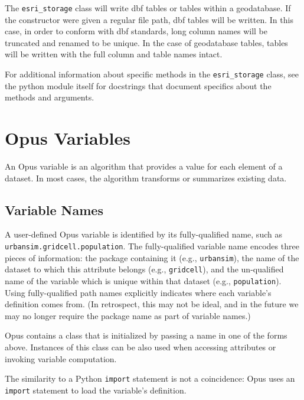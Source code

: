 {The \verb|esri_storage| class will write dbf tables or tables within a geodatabase.  If the 
constructor were given a regular file path, dbf tables will be written.  In this case, in order 
to conform with dbf standards, long column names will be truncated and renamed to be unique.  In the 
case of geodatabase tables, tables will be written with the full column and table names intact.

For additional information about specific methods in the \verb|esri_storage| class, see the python 
module itself for docstrings that document specifics about the methods and arguments.

\section{Opus Variables} 
\label{sec:opus-variable}
\variablesindex

An Opus variable \variablesindex is an algorithm that provides a value for
each element of a dataset. \datasetindex In most cases, the algorithm
transforms or summarizes existing data.

\subsection{Variable Names}
\label{sec:variable-names}
\variablesindex

A user-defined Opus variable \variablesindex is identified by its
fully-qualified name, such as \verb|urbansim.gridcell.population|.  The
fully-qualified variable \variablesindex name encodes three pieces of
information: the package containing it (e.g., \verb|urbansim|), the name of
the dataset \datasetindex to which this attribute \attributesindex belongs
(e.g., \verb|gridcell|), and the un-qualified name of the variable
\variablesindex which is unique within that dataset \datasetindex (e.g.,
\verb|population|).  Using fully-qualified path names explicitly indicates where
each variable's definition comes from.  (In retrospect, this may not be
ideal, and in the future we may no longer require the package name as part
of variable names.)

Opus contains a class  \variablesindex that is initialized by passing a
name in one of the forms above. Instances of this class can be also used when
accessing attributes \attributesindex or invoking variable \variablesindex computation.

The similarity to a Python \pythonindex \verb|import| statement is not a
coincidence: Opus uses an \verb|import| statement to load the variable's
\variablesindex definition.

}
